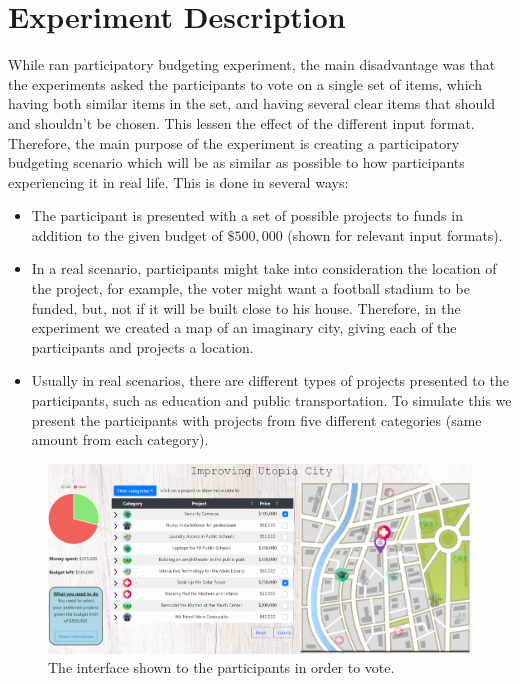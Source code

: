 \documentclass[10pt]{article}
\newcommand{\kibitz}[2]{\ifnum\Comments=1{\color{#1}{#2}}\fi}
\newcommand{\gb}[1]{\kibitz{green}{[GB:#1]}}
\begin{document}
\section{Experiment Description}\label{sec:description}


While \citet{benade2018efficiency} ran participatory budgeting experiment, the main disadvantage was that the experiments asked the participants to vote on a single set of items, which having both similar items in the set, and having several clear items that should and shouldn't be chosen. This lessen the effect of the different input format. Therefore, the main purpose of the experiment is creating a participatory budgeting scenario which will be as similar as possible to how participants experiencing it in real life. 
This is done in several ways: 
\begin{itemize}
    \item The participant is presented with a set of possible projects to funds in addition to the given budget of $\$500,000$ (shown for relevant input formats).
    \item In a real scenario, participants might take into consideration the location of the project, for example, the voter might want a football stadium to be funded, but, not if it will be built close to his house. Therefore, in the experiment we created a map of an imaginary city, giving each of the participants and projects a location.
    \item Usually in real scenarios, there are different types of projects presented to the participants, such as education and public transportation. To simulate this we present the participants with projects from five different categories (same amount from each category).
\end{itemize}

\begin{figure}[t]
\begin{center}
\includegraphics[width=15cm]{experiment/full system.PNG}
\caption{The interface shown to the participants in order to vote.
}\label{fig:interface}
\end{center}
\end{figure}
\end{document}
